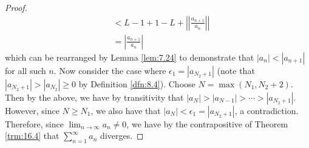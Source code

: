\documentclass[../main.tex]{subfiles}
\begin{document}
\begin{theorem}
\begin{enumerate}[label={\textup{(}\alph*\textup{)}},ref={\thetheorem\alph*}]
\begin{proof}
\begin{align*}
                &< L-1+1-L+\left| \left| \frac{a_{n+1}}{a_n} \right| \right|\\
                &= \left| \frac{a_{n+1}}{a_n} \right|
            \end{align*}
            which can be rearranged by Lemma \ref{lem:7.24} to demonstrate that $|a_n|<|a_{n+1}|$ for all such $n$. Now consider the case where $\epsilon_1=|a_{N_2+1}|$ (note that $|a_{N_2+1}|>|a_{N_2}|\geq 0$ by Definition \ref{dfn:8.4}). Choose $N=\max(N_1,N_2+2)$. Then by the above, we have by transitivity that $|a_N|>|a_{N-1}|>\cdots>|a_{N_2+1}|$. However, since $N\geq N_1$, we also have that $|a_N|<\epsilon_1=|a_{N_2+1}|$, a contradiction. Therefore, since $\lim_{n\to\infty}a_n\neq 0$, we have by the contrapositive of Theorem \ref{trm:16.4} that $\sum_{n=1}^\infty a_n$ diverges.
        \end{proof}
    \end{enumerate}
\end{theorem}
\end{document}
